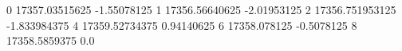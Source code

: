 0 17357.03515625 -1.55078125
1 17356.56640625 -2.01953125
2 17356.751953125 -1.833984375
4 17359.52734375 0.94140625
6 17358.078125 -0.5078125
8 17358.5859375 0.0
